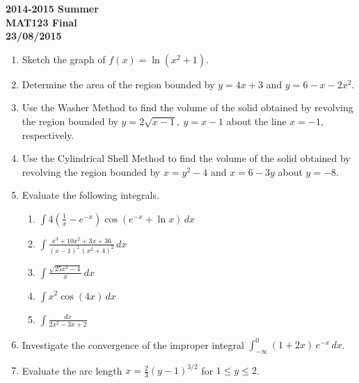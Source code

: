 \documentclass[a4paper, 12pt]{article}
\begin{document}
\pagestyle{empty}

\begin{center}
\textbf{2014-2015 Summer\\MAT123 Final\\23/08/2015}
\end{center}

\begin{enumerate}[leftmargin=*,label=\textbf{\arabic*.}]

\item Sketch the graph of $f(x)=\ln\left(x^2+1\right)$.

\item Determine the area of the region bounded by $y=4x+3$ and $y=6-x-2x^2$.

\item Use the Washer Method to find the volume of the solid obtained by revolving the region bounded by $y=2\sqrt{x-1},\: y=x-1$ about the line $x=-1$, respectively.

\item Use the Cylindrical Shell Method to find the volume of the solid obtained by revolving the region bounded by $x=y^2-4$ and $x=6-3y$ about $y=-8$.

\item Evaluate the following integrals.

\begin{enumerate}[leftmargin=*,label=\textbf{\alph*.}]

\item $\displaystyle\int4\left(\frac1x- e^{-x}\right)\cos\left( e^{-x}+\ln x\right)\,dx$

\item $\displaystyle\int\frac{x^3+10x^2+3x+36}{(x-1)^2\,\left(x^2+4\right)^2}\,dx$

\item $\displaystyle\int\frac{\sqrt{25x^2-4}}{x}\,dx$

\item $\displaystyle\int x^2\cos(4x)\,dx$

\item $\displaystyle\int\frac{dx}{2x^2-3x+2}$

\end{enumerate}

\item Investigate the convergence of the improper integral $\displaystyle\int_{-\infty}^0(1+2x)\, e^{-x}\,dx$.

\item Evaluate the arc length $\displaystyle x=\frac23(y-1)^{3/2}$ for $1\leq y\leq2$.

\end{enumerate}
\end{document}
